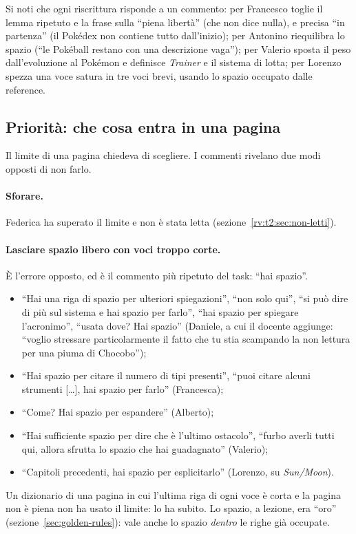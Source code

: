 \noindent Si noti che ogni riscrittura risponde a un commento: per Francesco
toglie il lemma ripetuto e la frase sulla ``piena libertà'' (che non dice
nulla), e precisa ``in partenza'' (il Pokédex non contiene tutto dall'inizio);
per Antonino riequilibra lo spazio (``le Pokéball restano con una descrizione
vaga''); per Valerio sposta il peso dall'evoluzione al Pokémon e definisce
\emph{Trainer} e il sistema di lotta; per Lorenzo spezza una voce satura in
tre voci brevi, usando lo spazio occupato dalle reference.

\subsection{Priorità: che cosa entra in una pagina}
\label{rv:t2:sec:priorita}

Il limite di una pagina chiedeva di scegliere. I commenti rivelano due modi
opposti di non farlo.

\paragraph{Sforare.} Federica ha superato il limite e non è stata letta
(sezione~\ref{rv:t2:sec:non-letti}).

\paragraph{Lasciare spazio libero con voci troppo corte.} È l'errore
opposto, ed è il commento più ripetuto del task: ``hai spazio''.
\begin{itemize}
  \item ``Hai una riga di spazio per ulteriori spiegazioni'', ``non solo
        qui'', ``si può dire di più sul sistema e hai spazio per farlo'',
        ``hai spazio per spiegare l'acronimo'', ``usata dove? Hai spazio''
        (Daniele, a cui il docente aggiunge: ``voglio stressare
        particolarmente il fatto che tu stia scampando la non lettura per una
        piuma di Chocobo'');
  \item ``Hai spazio per citare il numero di tipi presenti'', ``puoi citare
        alcuni strumenti [\dots], hai spazio per farlo'' (Francesca);
  \item ``Come? Hai spazio per espandere'' (Alberto);
  \item ``Hai sufficiente spazio per dire che è l'ultimo ostacolo'', ``furbo
        averli tutti qui, allora sfrutta lo spazio che hai guadagnato''
        (Valerio);
  \item ``Capitoli precedenti, hai spazio per esplicitarlo'' (Lorenzo, su
        \emph{Sun/Moon}).
\end{itemize}
Un dizionario di una pagina in cui l'ultima riga di ogni voce è corta e la
pagina non è piena non ha usato il limite: lo ha subito. Lo spazio, a lezione,
era ``oro'' (sezione~\ref{sec:golden-rules}): vale anche lo spazio
\emph{dentro} le righe già occupate.


